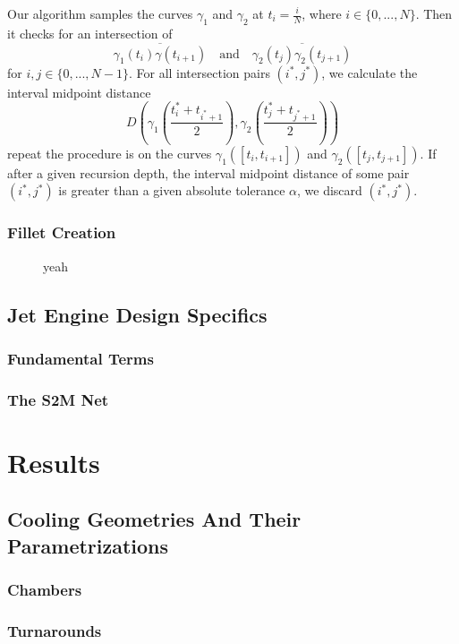 \documentclass[a4paper, 11pt]{report}
\theoremstyle{definition}
\begin{document}
	Our algorithm samples the curves $\gamma_1$ and $\gamma_2$ at $t_i = \frac{i}{N}$, where $i \in \{0,...,N\}$. Then it checks for an intersection of 
		$$\overline{\gamma_1(t_i) \gamma(t_{i+1})} \quad\text{and}\quad \overline{\gamma_2(t_j) \gamma_2(t_{j+1})}$$
	for $i,j \in \{0,...,N-1\}$. For all intersection pairs $(i^*, j^*)$, we calculate the interval midpoint distance
		$$D \left( \gamma_1 \left( \frac{t_i^* + t_{i^*+1}}{2} \right), \gamma_2 \left( \frac{t_j^* + t_{j^*+1}}{2} \right) \right)$$
	repeat the procedure is on the curves $\gamma_1([t_i, t_{i+1}])$ and $\gamma_2([t_j, t_{j+1}])$. If after a given recursion depth, the interval midpoint distance of some pair $(i^*, j^*)$ is greater than a given absolute tolerance $\alpha$, we discard $(i^*, j^*)$.

\subsection{Fillet Creation}
\begin{figure}[H]
	\centering
	
	\caption{yeah}
\end{figure}


\section{Jet Engine Design Specifics}
\subsection{Fundamental Terms}
\subsection{The S2M Net}

\chapter{Results}
\section{Cooling Geometries And Their Parametrizations}
\subsection{Chambers}
\subsection{Turnarounds}
\end{document}
